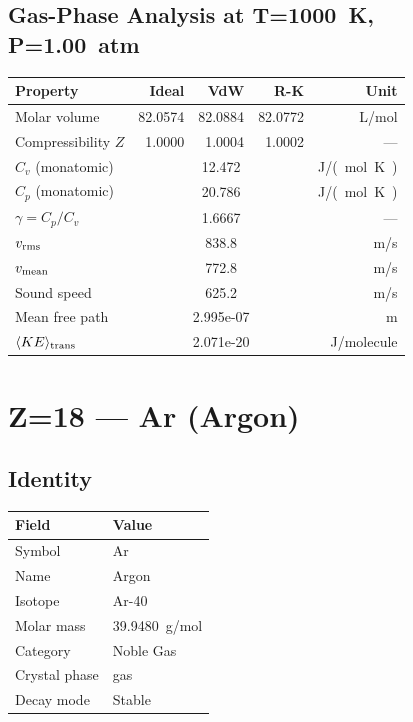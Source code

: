 \documentclass[11pt,a4paper]{article}
\begin{document}
\subsection{Gas-Phase Analysis at T=\SI{1000}{K}, P=\SI{1.00}{atm}}
\begin{tabular}{lrrrr}
  \toprule
  Property & Ideal & VdW & R-K & Unit \\
  \midrule
  Molar volume & 82.0574 & 82.0884 & 82.0772 & \si{L/mol} \\
  Compressibility $Z$ & 1.0000 & 1.0004 & 1.0002 & --- \\
  \midrule
  $C_v$ (monatomic) & \multicolumn{3}{c}{12.472} & \si{J/(mol.K)} \\
  $C_p$ (monatomic) & \multicolumn{3}{c}{20.786} & \si{J/(mol.K)} \\
  $\gamma = C_p/C_v$ & \multicolumn{3}{c}{1.6667} & --- \\
  $v_{\rm rms}$ & \multicolumn{3}{c}{838.8} & \si{m/s} \\
  $v_{\rm mean}$ & \multicolumn{3}{c}{772.8} & \si{m/s} \\
  Sound speed & \multicolumn{3}{c}{625.2} & \si{m/s} \\
  Mean free path & \multicolumn{3}{c}{2.995e-07} & \si{m} \\
  $\langle KE \rangle_{\rm trans}$ & \multicolumn{3}{c}{2.071e-20} & \si{J/molecule} \\
  \bottomrule
\end{tabular}

\newpage

\section{Z=18 --- Ar (Argon)}
\label{sec:Z18}

\subsection{Identity}
\begin{tabular}{ll}
  \toprule
  Field & Value \\
  \midrule
  Symbol & Ar \\
  Name & Argon \\
  Isotope & Ar-40 \\
  Molar mass & \SI{39.9480}{g/mol} \\
  Category & Noble Gas \\
  Crystal phase & gas \\
  Decay mode & Stable \\
  \bottomrule
\end{tabular}
\end{document}
